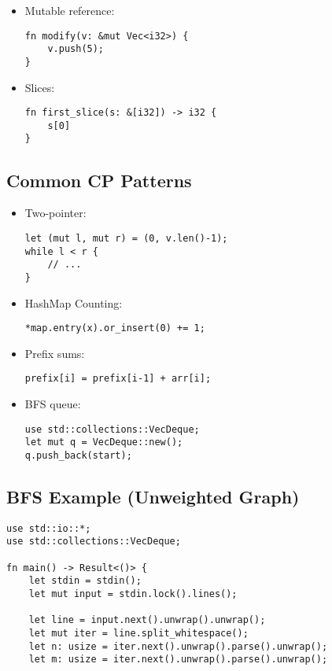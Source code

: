 \documentclass[letterpaper,landscape]{article}
\begin{document}
\begin{multicols*}{3}
\begin{itemize}
\item Mutable reference:
\begin{verbatim}
fn modify(v: &mut Vec<i32>) {
    v.push(5);
}
\end{verbatim}

\item Slices:
\begin{verbatim}
fn first_slice(s: &[i32]) -> i32 {
    s[0]
}
\end{verbatim}
\end{itemize}

\subsection*{Common CP Patterns}
\begin{itemize}
\item Two-pointer:
\begin{verbatim}
let (mut l, mut r) = (0, v.len()-1);
while l < r {
    // ...
}
\end{verbatim}

\item HashMap Counting:
\begin{verbatim}
*map.entry(x).or_insert(0) += 1;
\end{verbatim}

\item Prefix sums:
\begin{verbatim}
prefix[i] = prefix[i-1] + arr[i];
\end{verbatim}

\item BFS queue:
\begin{verbatim}
use std::collections::VecDeque;
let mut q = VecDeque::new();
q.push_back(start);
\end{verbatim}
\end{itemize}

\subsection*{BFS Example (Unweighted Graph)}
\begin{verbatim}
use std::io::*;
use std::collections::VecDeque;

fn main() -> Result<()> {
    let stdin = stdin();
    let mut input = stdin.lock().lines();

    let line = input.next().unwrap().unwrap();
    let mut iter = line.split_whitespace();
    let n: usize = iter.next().unwrap().parse().unwrap();
    let m: usize = iter.next().unwrap().parse().unwrap();


\end{verbatim}
\end{multicols*}
\end{document}
